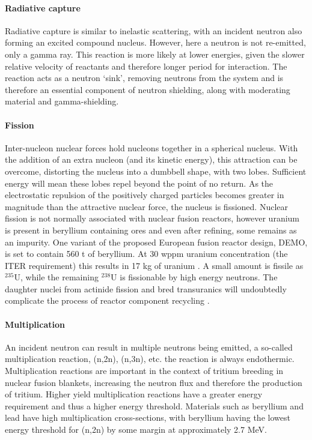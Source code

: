 \paragraph{Radiative capture}
Radiative capture is similar to inelastic scattering, with an incident neutron also forming an excited compound nucleus. However, here a neutron is not re-emitted, only a gamma ray. This reaction is more likely at lower energies, given the slower relative velocity of reactants and therefore longer period for interaction. The reaction acts as a neutron `sink', removing neutrons from the system and is therefore an essential component of neutron shielding, along with moderating material and gamma-shielding.

\paragraph{Fission}
Inter-nucleon nuclear forces hold nucleons together in a spherical nucleus. With the addition of an extra nucleon (and its kinetic energy), this attraction can be overcome, distorting the nucleus into a dumbbell shape, with two lobes. Sufficient energy will mean these lobes repel beyond the point of no return. As the electrostatic repulsion of the positively charged particles becomes greater in magnitude than the attractive nuclear force, the nucleus is fissioned. Nuclear fission is not normally associated with nuclear fusion reactors, however uranium is present in beryllium containing ores and even after refining, some remains as an impurity. One variant of the proposed European fusion reactor design, DEMO, is set to contain 560 t of beryllium. At 30 wppm uranium concentration (the ITER requirement) this results in 17 kg of uranium \cite{kolbasov2016}. A small amount is fissile as $^{235}$U, while the remaining $^{238}$U is fissionable by high energy neutrons. The daughter nuclei from actinide fission and bred transuranics will undoubtedly complicate the process of reactor component recycling \cite{cambi2010}.

\paragraph{Multiplication}
An incident neutron can result in multiple neutrons being emitted, a so-called multiplication reaction, (n,2n), (n,3n), etc. the reaction is always endothermic. Multiplication reactions are important in the context of tritium breeding in nuclear fusion blankets, increasing the neutron flux and therefore the production of tritium. Higher yield multiplication reactions have a greater energy requirement and thus a higher energy threshold. Materials such as beryllium and lead have high multiplication cross-sections, with beryllium having the lowest energy threshold for (n,2n) by some margin at approximately 2.7 MeV.

